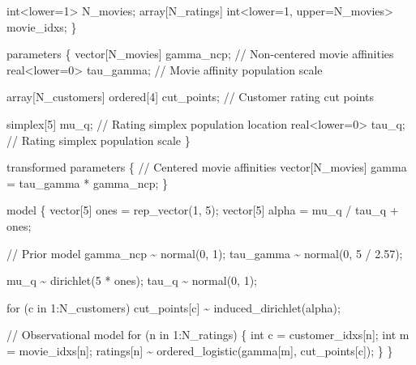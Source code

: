 \documentclass[
  letterpaper,
  DIV=11,
  numbers=noendperiod]{scrartcl}
\newenvironment{Shaded}{\begin{snugshade}}{\end{snugshade}}
\newcommand{\CommentTok}[1]{\textcolor[rgb]{0.37,0.37,0.37}{#1}}
\newcommand{\ControlFlowTok}[1]{\textcolor[rgb]{0.00,0.23,0.31}{#1}}
\newcommand{\DataTypeTok}[1]{\textcolor[rgb]{0.68,0.00,0.00}{#1}}
\newcommand{\DecValTok}[1]{\textcolor[rgb]{0.68,0.00,0.00}{#1}}
\newcommand{\FloatTok}[1]{\textcolor[rgb]{0.68,0.00,0.00}{#1}}
\newcommand{\KeywordTok}[1]{\textcolor[rgb]{0.00,0.23,0.31}{#1}}
\newcommand{\NormalTok}[1]{\textcolor[rgb]{0.00,0.23,0.31}{#1}}
\begin{document}
\begin{codelisting}
\begin{Shaded}
\begin{Highlighting}[]
  \DataTypeTok{int}\NormalTok{\textless{}}\KeywordTok{lower}\NormalTok{=}\DecValTok{1}\NormalTok{\textgreater{} N\_movies;}
  \DataTypeTok{array}\NormalTok{[N\_ratings] }\DataTypeTok{int}\NormalTok{\textless{}}\KeywordTok{lower}\NormalTok{=}\DecValTok{1}\NormalTok{, }\KeywordTok{upper}\NormalTok{=N\_movies\textgreater{} movie\_idxs;}
\NormalTok{\}}

\KeywordTok{parameters}\NormalTok{ \{}
  \DataTypeTok{vector}\NormalTok{[N\_movies] gamma\_ncp; }\CommentTok{// Non{-}centered movie affinities}
  \DataTypeTok{real}\NormalTok{\textless{}}\KeywordTok{lower}\NormalTok{=}\DecValTok{0}\NormalTok{\textgreater{} tau\_gamma;    }\CommentTok{// Movie affinity population scale}

  \DataTypeTok{array}\NormalTok{[N\_customers] }\DataTypeTok{ordered}\NormalTok{[}\DecValTok{4}\NormalTok{] cut\_points; }\CommentTok{// Customer rating cut points}

  \DataTypeTok{simplex}\NormalTok{[}\DecValTok{5}\NormalTok{] mu\_q;     }\CommentTok{// Rating simplex population location}
  \DataTypeTok{real}\NormalTok{\textless{}}\KeywordTok{lower}\NormalTok{=}\DecValTok{0}\NormalTok{\textgreater{} tau\_q; }\CommentTok{// Rating simplex population scale}
\NormalTok{\}}

\KeywordTok{transformed parameters}\NormalTok{ \{}
  \CommentTok{// Centered movie affinities}
  \DataTypeTok{vector}\NormalTok{[N\_movies] gamma = tau\_gamma * gamma\_ncp;}
\NormalTok{\}}

\KeywordTok{model}\NormalTok{ \{}
  \DataTypeTok{vector}\NormalTok{[}\DecValTok{5}\NormalTok{] ones = rep\_vector(}\DecValTok{1}\NormalTok{, }\DecValTok{5}\NormalTok{);}
  \DataTypeTok{vector}\NormalTok{[}\DecValTok{5}\NormalTok{] alpha = mu\_q / tau\_q + ones;}

  \CommentTok{// Prior model}
\NormalTok{  gamma\_ncp \textasciitilde{} normal(}\DecValTok{0}\NormalTok{, }\DecValTok{1}\NormalTok{);}
\NormalTok{  tau\_gamma \textasciitilde{} normal(}\DecValTok{0}\NormalTok{, }\DecValTok{5}\NormalTok{ / }\FloatTok{2.57}\NormalTok{);}

\NormalTok{  mu\_q \textasciitilde{} dirichlet(}\DecValTok{5}\NormalTok{ * ones);}
\NormalTok{  tau\_q \textasciitilde{} normal(}\DecValTok{0}\NormalTok{, }\DecValTok{1}\NormalTok{);}

  \ControlFlowTok{for}\NormalTok{ (c }\ControlFlowTok{in} \DecValTok{1}\NormalTok{:N\_customers)}
\NormalTok{    cut\_points[c] \textasciitilde{} induced\_dirichlet(alpha);}

  \CommentTok{// Observational model}
  \ControlFlowTok{for}\NormalTok{ (n }\ControlFlowTok{in} \DecValTok{1}\NormalTok{:N\_ratings) \{}
    \DataTypeTok{int}\NormalTok{ c = customer\_idxs[n];}
    \DataTypeTok{int}\NormalTok{ m = movie\_idxs[n];}
\NormalTok{    ratings[n] \textasciitilde{} ordered\_logistic(gamma[m], cut\_points[c]);}
\NormalTok{  \}}
\NormalTok{\}}


\end{Highlighting}
\end{Shaded}
\end{codelisting}
\end{document}
